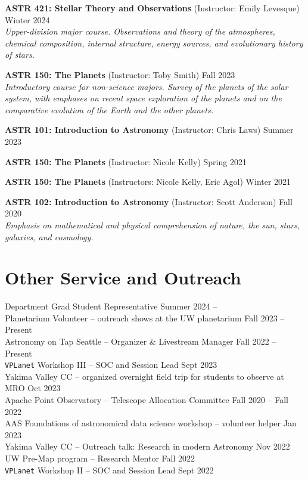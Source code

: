 \documentclass[a4,11pt]{article}
\begin{document}
\textbf{ASTR 421: Stellar Theory and Observations} (Instructor: Emily Levesque) \hfill Winter 2024 \\
\textsl{Upper-division major course. Observations and theory of the atmospheres, chemical composition, internal structure, energy sources, and evolutionary history of stars.} \vspace{.2cm}

\textbf{ASTR 150: The Planets} (Instructor: Toby Smith) \hfill Fall 2023  \\
\textsl{Introductory course for non-science majors. Survey of the planets of the solar system, with emphases on recent space exploration of the planets and on the comparative evolution of the Earth and the other planets.} \vspace{.2cm}

\textbf{ASTR 101: Introduction to Astronomy} (Instructor: Chris Laws) \hfill Summer 2023  \\
\vspace{.2cm}

\textbf{ASTR 150: The Planets} (Instructor: Nicole Kelly) \hfill Spring 2021  \\
\vspace{.2cm}

\textbf{ASTR 150: The Planets} (Instructors: Nicole Kelly, Eric Agol) \hfill Winter 2021  \\
\vspace{.2cm}

\textbf{ASTR 102: Introduction to Astronomy} (Instructor: Scott Anderson) \hfill Fall 2020 \\
\textsl{Emphasis on mathematical and physical comprehension of nature, the sun, stars, galaxies, and cosmology.}


\section{Other Service and Outreach}

Department Grad Student Representative \hfill Summer 2024 -- \\
Planetarium Volunteer -- outreach shows at the UW planetarium \hfill Fall 2023 -- Present \\
Astronomy on Tap Seattle -- Organizer \& Livestream Manager \hfill Fall 2022 -- Present \\
\texttt{VPLanet} Workshop III -- SOC and Session Lead \hfill Sept 2023 \\
Yakima Valley CC -- organized overnight field trip for students to observe at MRO \hfill Oct 2023 \\
Apache Point Observatory -- Telescope Allocation Committee \hfill Fall 2020 -- Fall 2022 \\
AAS Foundations of astronomical data science workshop -- volunteer helper \hfill Jan 2023 \\
Yakima Valley CC -- Outreach talk: Research in modern Astronomy \hfill Nov 2022 \\
UW Pre-Map program -- Research Mentor \hfill Fall 2022 \\
\texttt{VPLanet} Workshop II -- SOC and Session Lead \hfill Sept 2022 
\end{document}
